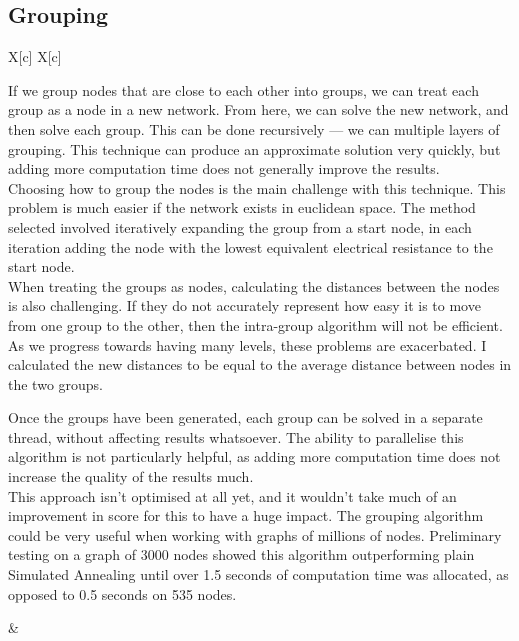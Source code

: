 \documentclass[a4paper, 11pt,table]{article}
\begin{document}
\subsection{Grouping}
\begin{tabu}{X[c] X[c]}
	\begin{minipage}{\linewidth}
If we group nodes that are close to each other into groups, we can treat each group as a node in a new network. From here, we can solve the new network, and then solve each group. This can be done recursively --- we can multiple layers of grouping. This technique can produce an approximate solution very quickly, but adding more computation time does not generally improve the results.\\

Choosing how to group the nodes is the main challenge with this technique. This problem is much easier if the network exists in euclidean space. The method selected involved iteratively expanding the group from a start node, in each iteration adding the node with the lowest equivalent electrical resistance to the start node.\\

When treating the groups as nodes, calculating the distances between the nodes is also challenging. If they do not accurately represent how easy it is to move from one group to the other, then the intra-group algorithm will not be efficient. As we progress towards having many levels, these problems are exacerbated. I calculated the new distances to be equal to the average distance between nodes in the two groups.

Once the groups have been generated, each group can be solved in a separate thread, without affecting results whatsoever. The ability to parallelise this algorithm is not particularly helpful, as adding more computation time does not increase the quality of the results much.\\

This approach isn't optimised at all yet, and it wouldn't take much of an improvement in score for this to have a huge impact. The grouping algorithm could be very useful when working with graphs of millions of nodes. Preliminary testing on a graph of 3000 nodes showed this algorithm outperforming plain Simulated Annealing until over 1.5 seconds of computation time was allocated, as opposed to 0.5 seconds on 535 nodes.

	\end{minipage}&

\begin{minipage}{\linewidth}
	\begin{center}
\end{center}
\end{minipage}
\end{tabu}
\end{document}
